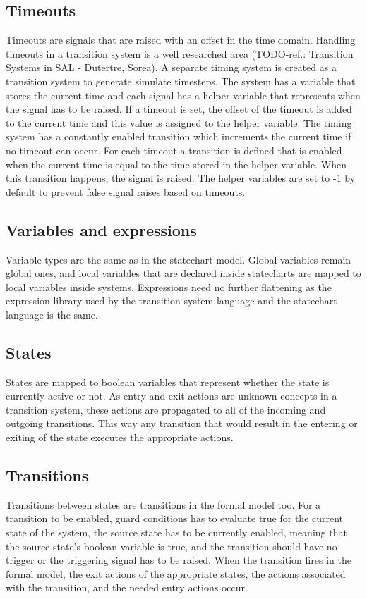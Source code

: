{  \subsection{Timeouts}
Timeouts are signals that are raised with an offset in the time domain. Handling timeouts in a transition system is a well researched area (TODO-ref.: Transition Systems in SAL - Dutertre, Sorea). A separate timing system is created as a transition system to generate simulate timesteps. The system has a variable that stores the current time and each signal has a helper variable that represents when the signal has to be raised. If a timeout is set, the offset of the timeout is added to the current time and this value is assigned to the helper variable. The timing system has a constantly enabled transition which increments the current time if no timeout can occur. For each timeout a transition is defined that is enabled when the current time is equal to the time stored in the helper variable. When this transition happens, the signal is raised. The helper variables are set to -1 by default to prevent false signal raises based on timeouts.
  \subsection{Variables and expressions}
Variable types are the same as in the statechart model. Global variables remain global ones, and local variables that are declared inside statecharts are mapped to local variables inside systems. Expressions need no further flattening as the expression library used by the transition system language and the statechart language is the same.
  \subsection{States}
States are mapped to boolean variables that represent whether the state is currently active or not. As entry and exit actions are unknown concepts in a transition system, these actions are propagated to all of the incoming and outgoing transitions. This way any transition that would result in the entering or exiting of the state executes the appropriate actions.
  \subsection{Transitions}
Transitions between states are transitions in the formal model too. For a transition to be enabled, guard conditions has to evaluate true for the current state of the system, the source state has to be currently enabled, meaning that the source state's boolean variable is true, and the transition should have no trigger or the triggering signal has to be raised. When the transition fires in the formal model, the exit actions of the appropriate states, the actions associated with the transition, and the needed entry actions occur.
}
